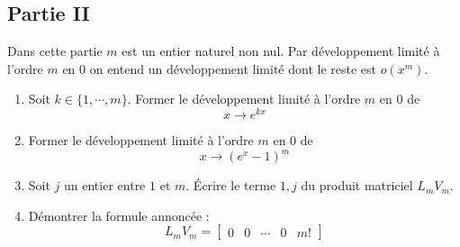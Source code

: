 \subsection*{Partie II}
Dans cette partie $m$ est un entier naturel non nul. Par développement limité à l'ordre $m$ en $0$ on entend un développement limité dont le reste est $o(x^m)$.
\begin{enumerate}
 \item Soit $k\in\{1,\cdots,m\}$. Former le développement limité à l'ordre $m$ en $0$ de
\begin{displaymath}
 x \rightarrow e^{kx}
\end{displaymath}
\item Former le développement limité à l'ordre $m$ en $0$ de
\begin{displaymath}
 x \rightarrow (e^{x}-1)^m
\end{displaymath}
\item Soit $j$ un entier entre $1$ et $m$. \'Ecrire le terme $1,j$ du produit matriciel $L_m V_m$.
\item Démontrer la formule annoncée :
\begin{displaymath}
 L_m V_m =
\begin{bmatrix}
 0 & 0 & \cdots & 0 & m!
\end{bmatrix}
\end{displaymath}
\end{enumerate}


